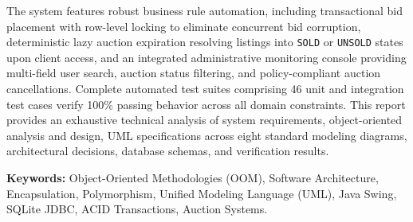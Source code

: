 \documentclass[12pt,a4paper]{article}
\begin{document}
The system features robust business rule automation, including transactional bid placement with row-level locking to eliminate concurrent bid corruption, deterministic lazy auction expiration resolving listings into \texttt{SOLD} or \texttt{UNSOLD} states upon client access, and an integrated administrative monitoring console providing multi-field user search, auction status filtering, and policy-compliant auction cancellations. Complete automated test suites comprising 46 unit and integration test cases verify 100\% passing behavior across all domain constraints. This report provides an exhaustive technical analysis of system requirements, object-oriented analysis and design, UML specifications across eight standard modeling diagrams, architectural decisions, database schemas, and verification results.

\bigskip
\noindent \textbf{Keywords:} Object-Oriented Methodologies (OOM), Software Architecture, Encapsulation, Polymorphism, Unified Modeling Language (UML), Java Swing, SQLite JDBC, ACID Transactions, Auction Systems.

\newpage

\tableofcontents
\newpage
\listoffigures
\newpage
\listoftables
\newpage

\setcounter{page}{1}


\newpage

\newpage

\newpage

\newpage

\newpage

\newpage

\newpage

\newpage

\newpage

\newpage


\newpage


\end{document}
